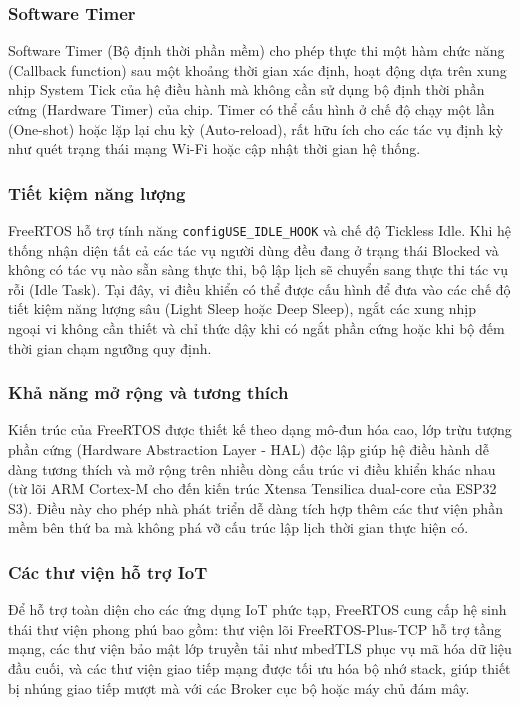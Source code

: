 \subsubsection{Software Timer}
Software Timer (Bộ định thời phần mềm) cho phép thực thi một hàm chức năng (Callback function) sau một khoảng thời gian xác định, hoạt động dựa trên xung nhịp System Tick của hệ điều hành mà không cần sử dụng bộ định thời phần cứng (Hardware Timer) của chip. Timer có thể cấu hình ở chế độ chạy một lần (One-shot) hoặc lặp lại chu kỳ (Auto-reload), rất hữu ích cho các tác vụ định kỳ như quét trạng thái mạng Wi-Fi hoặc cập nhật thời gian hệ thống.

\subsubsection{Tiết kiệm năng lượng}
FreeRTOS hỗ trợ tính năng \texttt{configUSE\_IDLE\_HOOK} và chế độ Tickless Idle. Khi hệ thống nhận diện tất cả các tác vụ người dùng đều đang ở trạng thái Blocked và không có tác vụ nào sẵn sàng thực thi, bộ lập lịch sẽ chuyển sang thực thi tác vụ rỗi (Idle Task). Tại đây, vi điều khiển có thể được cấu hình để đưa vào các chế độ tiết kiệm năng lượng sâu (Light Sleep hoặc Deep Sleep), ngắt các xung nhịp ngoại vi không cần thiết và chỉ thức dậy khi có ngắt phần cứng hoặc khi bộ đếm thời gian chạm ngưỡng quy định.

\subsubsection{Khả năng mở rộng và tương thích}
Kiến trúc của FreeRTOS được thiết kế theo dạng mô-đun hóa cao, lớp trừu tượng phần cứng (Hardware Abstraction Layer - HAL) độc lập giúp hệ điều hành dễ dàng tương thích và mở rộng trên nhiều dòng cấu trúc vi điều khiển khác nhau (từ lõi ARM Cortex-M cho đến kiến trúc Xtensa Tensilica dual-core của ESP32 S3). Điều này cho phép nhà phát triển dễ dàng tích hợp thêm các thư viện phần mềm bên thứ ba mà không phá vỡ cấu trúc lập lịch thời gian thực hiện có.

\subsubsection{Các thư viện hỗ trợ IoT}
Để hỗ trợ toàn diện cho các ứng dụng IoT phức tạp, FreeRTOS cung cấp hệ sinh thái thư viện phong phú bao gồm: thư viện lõi FreeRTOS-Plus-TCP hỗ trợ tầng mạng, các thư viện bảo mật lớp truyền tải như mbedTLS phục vụ mã hóa dữ liệu đầu cuối, và các thư viện giao tiếp mạng được tối ưu hóa bộ nhớ stack, giúp thiết bị nhúng giao tiếp mượt mà với các Broker cục bộ hoặc máy chủ đám mây.

